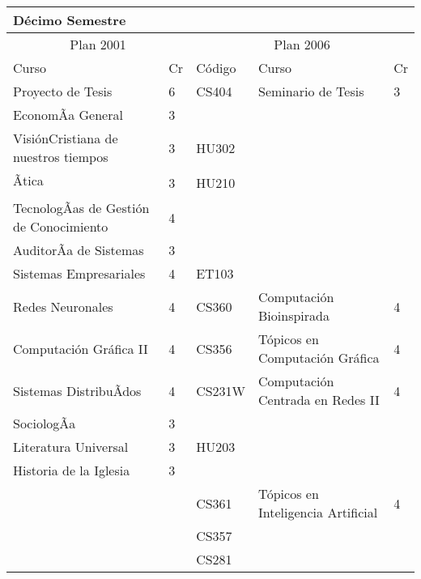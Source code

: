 \begin{center}
\begin{tabularx}{0.95\textwidth}{|p{4cm}|p{1cm}||p{2cm}|X|p{1cm}|}\hline
\multicolumn{5}{|l|}{\textbf{Décimo Semestre}} \\ \hline
\multicolumn{2}{|c|}{Plan 2001} & \multicolumn{3}{|c|}{Plan 2006} \\ \hline
Curso & Cr & Código & Curso & Cr \\ \hline
Proyecto de Tesis & 6 & CS404 & Seminario de Tesis & 3 \\ \hline
EconomÃ­a General & 3 &  &  & \\ \hline
VisiónCristiana de nuestros tiempos & 3 & HU302 &  & \\ \hline
Ãtica & 3 & HU210 &  & \\ \hline
TecnologÃ­as de Gestión de Conocimiento & 4 &  &  & \\ \hline
AuditorÃ­a de Sistemas & 3 &  &  & \\ \hline
Sistemas Empresariales & 4 & ET103 &  & \\ \hline
Redes Neuronales & 4 & CS360 & Computación Bioinspirada & 4 \\ \hline
Computación Gráfica II & 4 & CS356 & Tópicos en Computación Gráfica & 4 \\ \hline
Sistemas DistribuÃ­dos & 4 & CS231W & Computación Centrada en Redes II & 4 \\ \hline
SociologÃ­a & 3 &  &  & \\ \hline
Literatura Universal & 3 & HU203 &  & \\ \hline
Historia de la Iglesia & 3 &  &  & \\ \hline
 &  & CS361 & Tópicos en Inteligencia Artificial & 4 \\ \hline
 &  & CS357 &  & \\ \hline
 &  & CS281 &  & \\ \hline
\end{tabularx}
\end{center}

